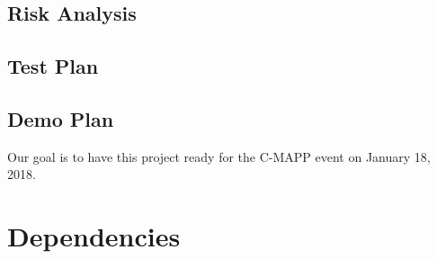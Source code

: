 \documentclass[titlepage,12pt]{article}
\begin{document}
\subsection{Risk Analysis}

\subsection{Test Plan}

\subsection{Demo Plan}
Our goal is to have this project ready for the C-MAPP event on January 18, 2018.

\section{Dependencies}
\end{document}
